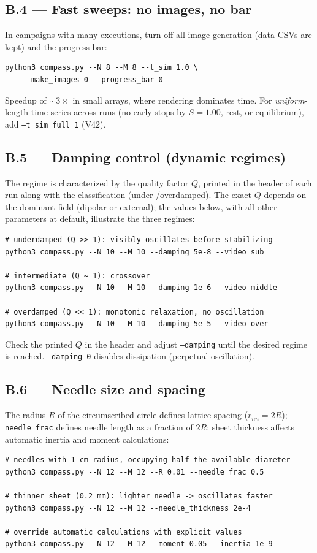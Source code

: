 \documentclass[11pt,a4paper]{article}
\newcommand{\code}[1]{\texttt{#1}}
\begin{document}
\subsection*{B.4 --- Fast sweeps: no images, no bar}

In campaigns with many executions, turn off all image generation (data CSVs are kept) and the progress bar:
\begin{verbatim}
python3 compass.py --N 8 --M 8 --t_sim 1.0 \
    --make_images 0 --progress_bar 0
\end{verbatim}
Speedup of $\sim 3\times$ in small arrays, where rendering dominates time. For \emph{uniform}-length time series across runs (no early stops by $S{=}1.00$, rest, or equilibrium), add \code{--t\_sim\_full 1} (V42).

\subsection*{B.5 --- Damping control (dynamic regimes)}

The regime is characterized by the quality factor $Q$, printed in the header of each run along with the classification (under-/overdamped). The exact $Q$ depends on the dominant field (dipolar or external); the values below, with all other parameters at default, illustrate the three regimes:
\begin{verbatim}
# underdamped (Q >> 1): visibly oscillates before stabilizing
python3 compass.py --N 10 --M 10 --damping 5e-8 --video sub

# intermediate (Q ~ 1): crossover
python3 compass.py --N 10 --M 10 --damping 1e-6 --video middle

# overdamped (Q << 1): monotonic relaxation, no oscillation
python3 compass.py --N 10 --M 10 --damping 5e-5 --video over
\end{verbatim}
Check the printed $Q$ in the header and adjust \code{--damping} until the desired regime is reached. \code{--damping 0} disables dissipation (perpetual oscillation).

\subsection*{B.6 --- Needle size and spacing}

The radius $R$ of the circumscribed circle defines lattice spacing ($r_{nn} = 2R$); \code{--needle\_frac} defines needle length as a fraction of $2R$; sheet thickness affects automatic inertia and moment calculations:
\begin{verbatim}
# needles with 1 cm radius, occupying half the available diameter
python3 compass.py --N 12 --M 12 --R 0.01 --needle_frac 0.5

# thinner sheet (0.2 mm): lighter needle -> oscillates faster
python3 compass.py --N 12 --M 12 --needle_thickness 2e-4

# override automatic calculations with explicit values
python3 compass.py --N 12 --M 12 --moment 0.05 --inertia 1e-9
\end{verbatim}
\end{document}
